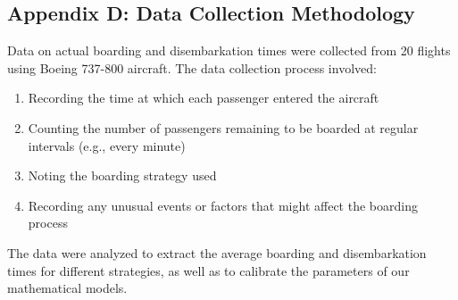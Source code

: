 \documentclass[12pt,a4paper]{article}
\begin{document}
\subsection{Appendix D: Data Collection Methodology}

Data on actual boarding and disembarkation times were collected from 20 flights using Boeing 737-800 aircraft. The data collection process involved:

\begin{enumerate}
    \item Recording the time at which each passenger entered the aircraft
    \item Counting the number of passengers remaining to be boarded at regular intervals (e.g., every minute)
    \item Noting the boarding strategy used
    \item Recording any unusual events or factors that might affect the boarding process
\end{enumerate}

The data were analyzed to extract the average boarding and disembarkation times for different strategies, as well as to calibrate the parameters of our mathematical models.
\end{document}
